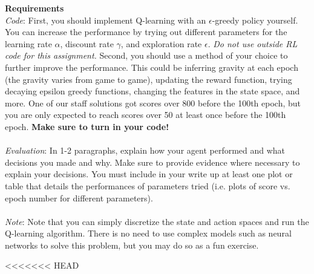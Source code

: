 \documentclass[submit]{../harvardml}
\begin{document}
\begin{problem}
\textbf{Requirements}
\\
\textit{Code}: First, you should implement Q-learning with an
$\epsilon$-greedy policy yourself. You can increase the performance by
trying out different parameters for the learning rate $\alpha$,
discount rate $\gamma$, and exploration rate $\epsilon$. \emph{Do not use outside RL code for this assignment.} Second, you should use a method of your choice to further improve the performance. This could be inferring gravity at each epoch (the gravity varies from game to game), updating the reward function, trying decaying epsilon greedy functions, changing the features in the state space, and more. One of our staff solutions got scores over 800 before the 100th epoch, but you are only expected to reach scores over 50 at least once before the 100th epoch. {\bf Make sure to turn in your code!} \\\\

\textit{Evaluation}: In 1-2 paragraphs, explain how your agent performed and what decisions you made and why. Make sure to provide evidence where necessary to explain your decisions. You must include in your write up at least one plot or table that details the performances of parameters tried (i.e. plots of score vs. epoch number for different parameters). \\\\

\textit{Note}: Note that you can simply discretize the state and action spaces and run the Q-learning algorithm. There is no need to use complex models such as neural networks to solve this problem, but you may do so as a fun exercise.

\end{problem}
<<<<<<< HEAD
\end{document}
